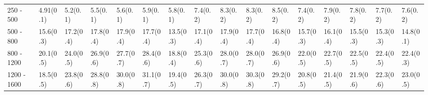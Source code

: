 \begin{table}
{\begin{tabular}{llllllllllllllll}
\multicolumn{1}{l||}{250 - 500}      & \multicolumn{1}{l|}{4.91(0.1)}       & \multicolumn{1}{l|}{5.2(0.1)}  		& \multicolumn{1}{l|}{5.5(0.1)}  		& \multicolumn{1}{l|}{5.6(0.1)}  								& \multicolumn{1}{l||}{5.9(0.1)}  					    & \multicolumn{1}{l|}{5.8(0.1)}         	& \multicolumn{1}{l|}{7.4(0.2)}  	& \multicolumn{1}{l|}{8.3(0.2)} 				 		& \multicolumn{1}{l|}{8.3(0.2)}  					& \multicolumn{1}{l||}{\cellcolor{Red!50}8.5(0.2)}  	& \multicolumn{1}{l|}{7.4(0.2)}         & \multicolumn{1}{l|}{7.9(0.2)}  	& \multicolumn{1}{l|}{7.8(0.2)}  	& \multicolumn{1}{l|}{7.7(0.2)}  	& \multicolumn{1}{l|}{7.6(0.2)}  \\
\multicolumn{1}{l||}{500 - 800}      & \multicolumn{1}{l|}{15.6(0.3)}        & \multicolumn{1}{l|}{17.2(0.4)} 		& \multicolumn{1}{l|}{17.8(0.4)} 		& \multicolumn{1}{l|}{\cellcolor{Red!50}17.9(0.4)} 				& \multicolumn{1}{l||}{17.7(0.4)} 						& \multicolumn{1}{l|}{13.5(0.3)}        	& \multicolumn{1}{l|}{17.1(0.4)} 	& \multicolumn{1}{l|}{\cellcolor{Red!50}17.9(0.4)}		& \multicolumn{1}{l|}{17.7(0.4)} 					& \multicolumn{1}{l||}{16.8(0.4)} 						& \multicolumn{1}{l|}{15.7(0.3)}        & \multicolumn{1}{l|}{16.1(0.4)} 	& \multicolumn{1}{l|}{15.5(0.3)} 	& \multicolumn{1}{l|}{15.3(0.3)} 	& \multicolumn{1}{l|}{14.8(0.1)} \\
\multicolumn{1}{l||}{800 - 1200}     & \multicolumn{1}{l|}{20.1(0.5)}        & \multicolumn{1}{l|}{24.0(0.5)} 		& \multicolumn{1}{l|}{26.9(0.6)} 		& \multicolumn{1}{l|}{27.7(0.7)} 								& \multicolumn{1}{l||}{\cellcolor{Red!50}28.4(0.6)} 	& \multicolumn{1}{l|}{18.8(0.4)}        	& \multicolumn{1}{l|}{25.3(0.6)} 	& \multicolumn{1}{l|}{28.0(0.7)} 						& \multicolumn{1}{l|}{28.0(0.7)} 					& \multicolumn{1}{l||}{26.9(0.6)} 						& \multicolumn{1}{l|}{22.0(0.5)}        & \multicolumn{1}{l|}{22.7(0.5)} 	& \multicolumn{1}{l|}{22.5(0.5)} 	& \multicolumn{1}{l|}{22.4(0.5)} 	& \multicolumn{1}{l|}{22.4(0.3)} \\
\multicolumn{1}{l||}{1200 - 1600}    & \multicolumn{1}{l|}{18.5(0.5)}        & \multicolumn{1}{l|}{23.8(0.6)} 		& \multicolumn{1}{l|}{28.8(0.8)} 		& \multicolumn{1}{l|}{30.0(0.8)} 								& \multicolumn{1}{l||}{\cellcolor{Red!50}31.1(0.7)} 						& \multicolumn{1}{l|}{19.4(0.5)}        	& \multicolumn{1}{l|}{26.3(0.7)} 	& \multicolumn{1}{l|}{30.0(0.8)} 						& \multicolumn{1}{l|}{30.3(0.8)} 	& \multicolumn{1}{l||}{29.2(0.7)} 						& \multicolumn{1}{l|}{20.8(0.5)}        & \multicolumn{1}{l|}{21.4(0.5)} 	& \multicolumn{1}{l|}{21.9(0.6)} 	& \multicolumn{1}{l|}{22.3(0.6)} 	& \multicolumn{1}{l|}{23.0(0.5)} \\

\end{tabular}}
\end{table}
